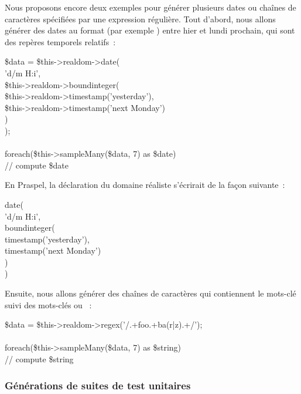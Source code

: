 \begin{example}

Nous proposons encore deux exemples pour générer plusieurs dates ou chaînes de
caractères spécifiées par une expression régulière. Tout d'abord, nous allons
générer des dates au format  (par exemple )
entre hier et lundi prochain, qui sont des repères temporels relatifs~:

%
\begin{pre}
\$data = \$this->realdom->date( \\
    'd/m H:i', \\
    \$this->realdom->boundinteger( \\
        \$this->realdom->timestamp('yesterday'), \\
        \$this->realdom->timestamp('next Monday') \\
    ) \\
); \\
 \\
foreach(\$this->sampleMany(\$data, 7) as \$date) \\
    // compute \$date
\end{pre}
%
En Praspel, la déclaration du domaine réaliste s'écrirait de la façon suivante~:
%
\begin{pre}
date( \\
    'd/m H:i', \\
    boundinteger( \\
        timestamp('yesterday'), \\
        timestamp('next Monday') \\
    ) \\
)
\end{pre}

Ensuite, nous allons générer des chaînes de caractères qui contiennent
le mots-clé  suivi des mots-clés  ou ~:
%
\begin{pre}
\$data = \$this->realdom->regex('/.+foo.+ba(r|z).+/'); \\
 \\
foreach(\$this->sampleMany(\$data, 7) as \$string) \\
    // compute \$string
\end{pre}

\end{example}

\subsubsection{Générations de suites de test unitaires}

